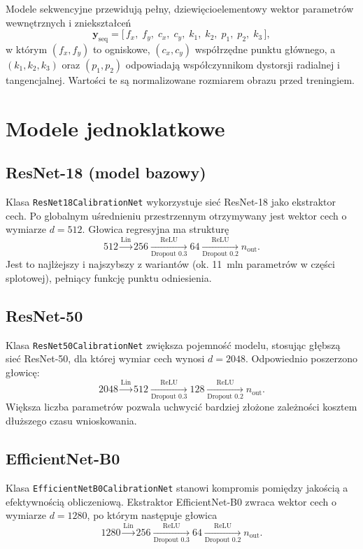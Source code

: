 \documentclass[12pt,a4paper]{report}
\begin{document}
Modele sekwencyjne przewidują pełny, dziewięcioelementowy wektor parametrów wewnętrznych
i zniekształceń
\begin{equation}
  \mathbf{y}_{\text{seq}} = \big[\, f_x,\; f_y,\; c_x,\; c_y,\; k_1,\; k_2,\; p_1,\; p_2,\; k_3 \,\big],
\end{equation}
w którym $(f_x, f_y)$ to ogniskowe, $(c_x, c_y)$ współrzędne punktu głównego, a
$(k_1, k_2, k_3)$ oraz $(p_1, p_2)$ odpowiadają współczynnikom dystorsji radialnej i
tangencjalnej. Wartości te są normalizowane rozmiarem obrazu przed treningiem.

\section{Modele jednoklatkowe}

\subsection{ResNet-18 (model bazowy)}
Klasa \texttt{ResNet18CalibrationNet} wykorzystuje sieć ResNet-18 jako ekstraktor cech.
Po globalnym uśrednieniu przestrzennym otrzymywany jest wektor cech o wymiarze
$d = 512$. Głowica regresyjna ma strukturę
\begin{equation}
  512 \xrightarrow{\text{Lin}} 256 \xrightarrow[\text{Dropout }0.3]{\text{ReLU}}
  64 \xrightarrow[\text{Dropout }0.2]{\text{ReLU}} n_{\text{out}} .
\end{equation}
Jest to najlżejszy i najszybszy z wariantów (ok. 11~mln parametrów w części splotowej),
pełniący funkcję punktu odniesienia.

\subsection{ResNet-50}
Klasa \texttt{ResNet50CalibrationNet} zwiększa pojemność modelu, stosując głębszą sieć
ResNet-50, dla której wymiar cech wynosi $d = 2048$. Odpowiednio poszerzono głowicę:
\begin{equation}
  2048 \xrightarrow{\text{Lin}} 512 \xrightarrow[\text{Dropout }0.3]{\text{ReLU}}
  128 \xrightarrow[\text{Dropout }0.2]{\text{ReLU}} n_{\text{out}} .
\end{equation}
Większa liczba parametrów pozwala uchwycić bardziej złożone zależności kosztem
dłuższego czasu wnioskowania.

\subsection{EfficientNet-B0}
Klasa \texttt{EfficientNetB0CalibrationNet} stanowi kompromis pomiędzy jakością a
efektywnością obliczeniową. Ekstraktor EfficientNet-B0 zwraca wektor cech o wymiarze
$d = 1280$, po którym następuje głowica
\begin{equation}
  1280 \xrightarrow{\text{Lin}} 256 \xrightarrow[\text{Dropout }0.3]{\text{ReLU}}
  64 \xrightarrow[\text{Dropout }0.2]{\text{ReLU}} n_{\text{out}} .
\end{equation}
\end{document}
